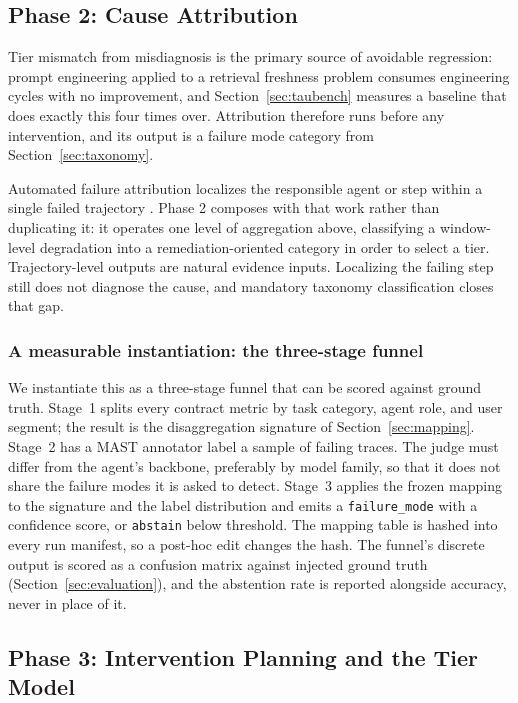 \documentclass[conference]{IEEEtran}
\newcommand{\code}[1]{\texttt{\small #1}}
\begin{document}
\subsection{Phase 2: Cause Attribution}
\label{sec:attribution}

Tier mismatch from misdiagnosis is the primary source of avoidable regression:
prompt engineering applied to a retrieval freshness problem consumes
engineering cycles with no improvement, and Section~\ref{sec:taubench} measures
a baseline that does exactly this four times over. Attribution therefore runs
before any intervention, and its output is a failure mode category from
Section~\ref{sec:taxonomy}.

Automated failure attribution localizes the responsible agent or step within a
single failed trajectory \cite{zhu2026, ma2025attribution, zhang2025,
agenttrace2026}. Phase 2 composes with that work rather than duplicating it: it
operates one level of aggregation above, classifying a window-level degradation
into a remediation-oriented category in order to select a tier.
Trajectory-level outputs are natural evidence inputs. Localizing the failing
step still does not diagnose the cause, and mandatory taxonomy classification
closes that gap.

\subsubsection{A measurable instantiation: the three-stage funnel}
\label{sec:funnel}
We instantiate this as a three-stage funnel that can be scored against
ground truth. Stage~1 splits every contract metric by task category, agent
role, and user segment; the result is the disaggregation signature of
Section~\ref{sec:mapping}. Stage~2 has a MAST annotator \cite{cemri2025} label
a sample of failing traces. The judge must differ from the agent's backbone,
preferably by model family, so that it does not share the failure modes it is
asked to detect. Stage~3 applies the frozen mapping to the signature and the
label distribution and emits a \code{failure\_mode} with a confidence score,
or \code{abstain} below threshold. The mapping table is hashed into every run
manifest, so a post-hoc edit changes the hash. The funnel's discrete output is scored as a confusion matrix
against injected ground truth (Section~\ref{sec:evaluation}), and the
abstention rate is reported alongside accuracy, never in place of it.

\subsection{Phase 3: Intervention Planning and the Tier Model}
\end{document}
